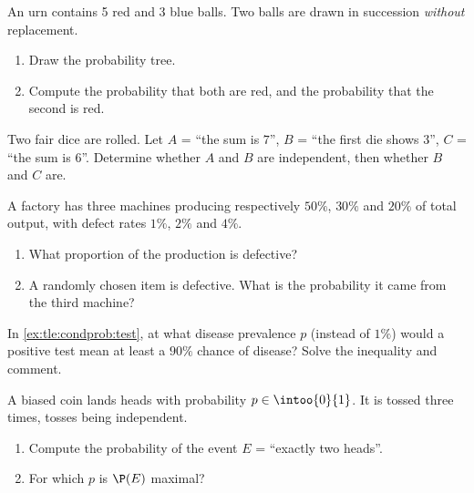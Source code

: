 \begin{exercise}[$\star$]\label{exo:tle:condprob:2}
An urn contains 5 red and 3 blue balls. Two balls are drawn in succession
\emph{without} replacement.
\begin{enumerate}
  \item Draw the probability tree.
  \item Compute the probability that both are red, and the probability that
        the second is red.
\end{enumerate}
\end{exercise}

\begin{exercise}[$\star$]\label{exo:tle:condprob:3}
Two fair dice are rolled. Let $A$ = ``the sum is $7$'', $B$ = ``the first
die shows $3$'', $C$ = ``the sum is $6$''. Determine whether $A$ and $B$
are independent, then whether $B$ and $C$ are.
\end{exercise}

\begin{exercise}[$\star\star$]\label{exo:tle:condprob:4}
A factory has three machines producing respectively $50\%$, $30\%$ and
$20\%$ of total output, with defect rates $1\%$, $2\%$ and $4\%$.
\begin{enumerate}
  \item What proportion of the production is defective?
  \item A randomly chosen item is defective. What is the probability it
        came from the third machine?
\end{enumerate}
\end{exercise}

\begin{exercise}[$\star\star$]\label{exo:tle:condprob:5}
In \cref{ex:tle:condprob:test}, at what disease prevalence $p$ (instead of
$1\%$) would a positive test mean at least a $90\%$ chance of disease? Solve
the inequality and comment.
\end{exercise}

\begin{exercise}[$\star\star$]\label{exo:tle:condprob:6}
A biased coin lands heads with probability $p \in \intoo{0}{1}$. It is
tossed three times, tosses being independent.
\begin{enumerate}
  \item Compute the probability of the event $E$ = ``exactly two heads''.
  \item For which $p$ is $\P(E)$ maximal?
\end{enumerate}
\end{exercise}

